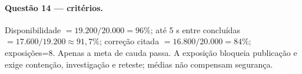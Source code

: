 \paragraph{Questão 14 — critérios.} Disponibilidade $=19.200/20.000=96\%$; até 5 s entre concluídas $=17.600/19.200\approx91{,}7\%$; correção citada $=16.800/20.000=84\%$; exposições=8. Apenas a meta de cauda passa. A exposição bloqueia publicação e exige contenção, investigação e reteste; médias não compensam segurança.
